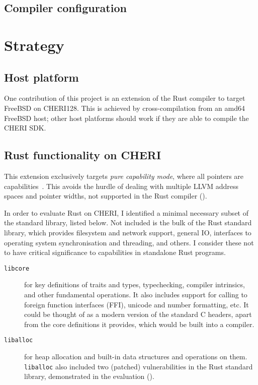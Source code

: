 \documentclass[dissertation.tex]{subfiles}
\begin{document}
\subsection{Compiler configuration}


\section{Strategy}
\label{sec:impl-what}

\subsection{Host platform}
One contribution of this project is an extension of the Rust compiler to
target FreeBSD on CHERI128.
This is achieved by cross-compilation from an amd64 FreeBSD host; other
host platforms should work if they are able to compile the CHERI SDK.

\subsection{Rust functionality on CHERI}
This extension exclusively targets \emph{pure capability mode}, where
all pointers are capabilities~\cite{cheri-prog-guide}.
This avoids the hurdle of dealing with multiple LLVM address spaces and
pointer widths, not supported in the Rust compiler
().

In order to evaluate Rust on CHERI, I identified
a minimal necessary subset of the standard library, listed below.
Not included is the bulk of the Rust standard library, which provides
filesystem and network support, general IO, interfaces to operating
system synchronisation and threading, and others.
I consider these not to have critical significance to capabilities in
standalone Rust programs.

\begin{description}
    \item[\texttt{libcore}] for key definitions of traits and types,
    typechecking, compiler intrinsics, and other fundamental operations.
    It also includes support for calling to foreign function interfaces
    (FFI), unicode and number formatting, etc.
    It could be thought of as a modern version of the standard C
    headers, apart from the core definitions it provides, which would be
    built into a compiler.
    \item[\texttt{liballoc}] for heap allocation and built-in data
    structures and operations on them.
    \texttt{liballoc} also included two (patched) vulnerabilities in the
    Rust standard library, demonstrated in the evaluation
    ().
\end{description}
\end{document}

